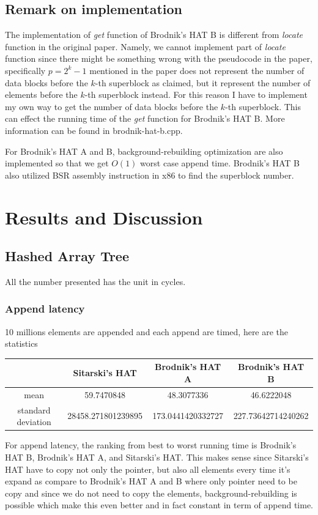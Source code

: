 \documentclass{article} %
\begin{document}
    \subsection*{Remark on implementation}
    The implementation of \emph{get} function of Brodnik's HAT B is different from \emph{locate} function in the original paper.
    Namely, we cannot implement part of \emph{locate} function since there might be something wrong with the pseudocode in the paper,
    specifically \emph{$p=2^k - 1$} mentioned in the paper does not represent the number of data blocks before the $k$-th superblock as claimed,
    but it represent the number of elements before the $k$-th superblock instead. For this reason I have to implement my own way to get the number of
    data blocks before the $k$-th superblock. This can effect the running time of the \emph{get} function for Brodnik's HAT B. More information can be found in brodnik-hat-b.cpp.

    For Brodnik's HAT A and B, background-rebuilding optimization are also implemented so that we get $O(1)$ worst case append time. Brodnik's HAT B also utilized BSR assembly instruction in x86 to find
    the superblock number.

    \section*{Results and Discussion}
    \subsection*{Hashed Array Tree}
    All the number presented has the unit in cycles.
    \subsubsection*{Append latency}
    10 millions elements are appended and each append are timed, here are the statistics
    \begin{center}
        \begin{tabular}{|c|c|c|c|}\hline
        & Sitarski's HAT & Brodnik's HAT A & Brodnik's HAT B\\\hline
        mean &  59.7470848 & 48.3077336 & 46.6222048\\\hline
        standard deviation & 28458.271801239895  & 173.0441420332727 & 227.73642714240262\\\hline
        \end{tabular}
    \end{center}
    For append latency, the ranking from best to worst running time is Brodnik's HAT B, Brodnik's HAT A, and Sitarski's HAT.
    This makes sense since Sitarski's HAT have to copy not only the pointer, but also all elements every time it's expand as compare to Brodnik's HAT A
    and B where only pointer need to be copy and since we do not need to copy the elements, background-rebuilding is possible which make this even better and in fact constant in term of append time.
\end{document}
